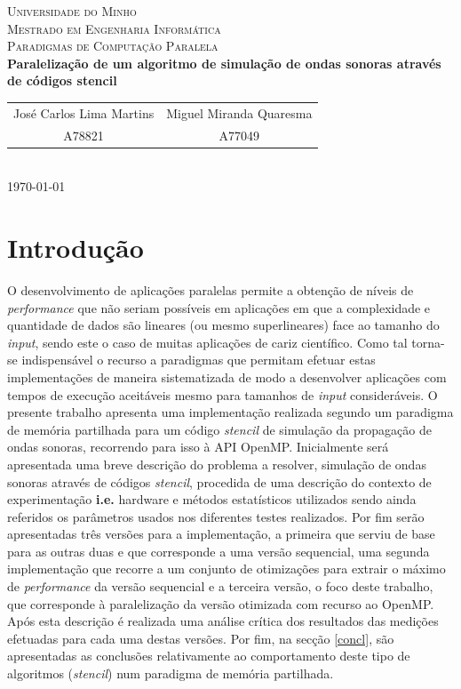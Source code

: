 \documentclass{article}
\begin{document}
{
\center
\textsc{\Large Universidade do Minho} \\ [0.5cm]
\textsc{\Large Mestrado em Engenharia Informática} \\ [0.5cm]
\textsc{\large Paradigmas de Computação Paralela} \\ [0.5cm]

{\LARGE \bfseries Paralelização de um algoritmo de simulação de ondas sonoras através de códigos stencil} \\[0.5cm]

\begin{tabular}{c c}
    José Carlos Lima Martins & Miguel Miranda Quaresma \\
    A78821 & A77049  \\
\end{tabular} \\[0.5cm]

\today \\[1cm]
}

\section{Introdução}
O desenvolvimento de aplicações paralelas permite a obtenção de níveis de \textit{performance} que não seriam possíveis em aplicações em que a complexidade e quantidade de dados são lineares (ou mesmo superlineares) face ao tamanho do \textit{input}, sendo este o caso de muitas aplicações de cariz científico. Como tal torna-se indispensável o recurso a paradigmas que permitam efetuar estas implementações de maneira sistematizada de modo a desenvolver aplicações com tempos de execução aceitáveis mesmo para tamanhos de \textit{input} consideráveis. O presente trabalho apresenta uma implementação realizada segundo um paradigma de memória partilhada para um código \textit{stencil} de simulação da propagação de ondas sonoras, recorrendo para isso à API 
OpenMP. Inicialmente será apresentada uma breve descrição do problema a resolver, simulação de ondas sonoras através de códigos \textit{stencil}, procedida de uma descrição do contexto de experimentação \textbf{i.e.} hardware e métodos estatísticos 
utilizados sendo ainda referidos os parâmetros usados nos diferentes testes realizados. Por fim serão apresentadas três versões para a implementação, a primeira que serviu de base para as outras duas e que corresponde a uma versão sequencial, uma segunda implementação que recorre a um conjunto de otimizações para extrair o máximo de \textit{performance} da versão sequencial e a terceira versão, o foco deste trabalho, que corresponde à paralelização da versão otimizada com recurso ao OpenMP. Após 
esta descrição é realizada uma análise crítica dos resultados das medições efetuadas para cada uma destas versões. Por fim, na secção \ref{concl}, são apresentadas as conclusões relativamente ao comportamento deste tipo de algoritmos (\textit{stencil}) 
num paradigma de memória partilhada.
\end{document}
